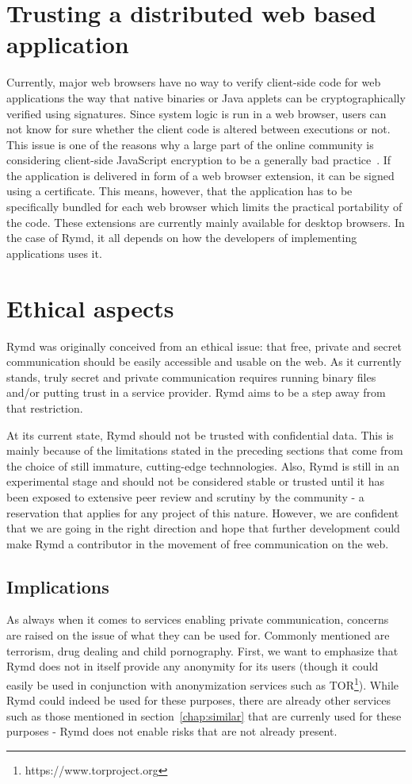 \section{Trusting a distributed web based application}
Currently, major web browsers have no way to verify client-side code for web applications the way that native binaries or Java applets can be cryptographically verified using signatures. Since system logic is run in a web browser, users can not know for sure whether the client code is altered between executions or not. This issue is one of the reasons why a large part of the online community is considering client-side JavaScript encryption to be a generally bad practice~\cite{Matasano:Online}. If the application is delivered in form of a web browser extension, it can be signed using a certificate. This means, however, that the application has to be specifically bundled for each web browser which limits the practical portability of the code. These extensions are currently mainly available for desktop browsers. In the case of Rymd, it all depends on how the developers of implementing applications uses it.

\section{Ethical aspects}
Rymd was originally conceived from an ethical issue: that free, private and secret communication should be easily accessible and usable on the web. As it currently stands, truly secret and private communication requires running binary files and/or putting trust in a service provider. Rymd aims to be a step away from that restriction.

At its current state, Rymd should not be trusted with confidential data. This is mainly because of the limitations stated in the preceding sections that come from the choice of still immature, cutting-edge technnologies. Also, Rymd is still in an experimental stage and should not be considered stable or trusted until it has been exposed to extensive peer review and scrutiny by the community - a reservation that applies for any project of this nature. However, we are confident that we are going in the right direction and hope that further development could make Rymd a contributor in the movement of free communication on the web.

\subsection{Implications}
As always when it comes to services enabling private communication, concerns are raised on the issue of what they can be used for. Commonly mentioned are terrorism, drug dealing and child pornography. First, we want to emphasize that Rymd does not in itself provide any anonymity for its users (though it could easily be used in conjunction with anonymization services such as TOR\footnote{https://www.torproject.org}). While Rymd could indeed be used for these purposes, there are already other services such as those mentioned in section~\ref{chap:similar} that are currenly used for these purposes - Rymd does not enable risks that are not already present.

